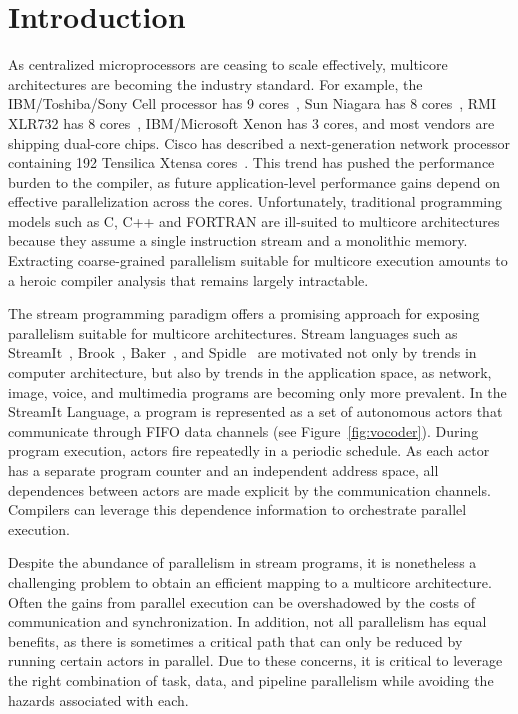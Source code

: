 \section{Introduction}


As centralized microprocessors are ceasing to scale effectively,
multicore architectures are becoming the industry standard.  For
example, the IBM/Toshiba/Sony Cell processor has 9 cores~\cite{Cell-hpca}, Sun
Niagara has 8 cores~\cite{Niagara}, RMI XLR732 has 8 cores~\cite{RMI-web},
IBM/Micro\-soft Xenon has 3 cores, and most vendors are shipping
dual-core chips.  Cisco has described a next-generation network
processor containing 192 Tensilica Xtensa cores~\cite{etherton05ancs}.
This trend has pushed the performance burden to the compiler, as
future application-level performance gains depend on effective
parallelization across the cores.  Unfortunately, traditional
programming models such as C, C++ and FORTRAN are ill-suited to
multicore architectures because they assume a single instruction
stream and a monolithic memory.  Extracting coarse-grained parallelism
suitable for multicore execution amounts to a heroic compiler analysis
that remains largely intractable.

The stream programming paradigm offers a promising approach for
exposing parallelism suitable for multicore architectures.  Stream
languages such as StreamIt~\cite{streamitcc}, Brook~\cite{brook04},
Baker~\cite{Baker}, and Spidle~\cite{spidle03} are motivated not only by
trends in computer architecture, but also by trends in the application
space, as network, image, voice, and multimedia programs are becoming
only more prevalent.  In the StreamIt Language, a program is represented
as a set of autonomous actors that communicate through FIFO data
channels (see Figure~\ref{fig:vocoder}).  During program execution,
actors fire repeatedly in a periodic schedule.  As each actor has a
separate program counter and an independent address space, all
dependences between actors are made explicit by the communication
channels.  Compilers can leverage this dependence information to
orchestrate parallel execution.

Despite the abundance of parallelism in stream programs, it is
nonetheless a challenging problem to obtain an efficient mapping to a
multicore architecture.  Often the gains from parallel execution can
be overshadowed by the costs of communication and synchronization.  In
addition, not all parallelism has equal benefits, as there is
sometimes a critical path that can only be reduced by running certain
actors in parallel.  Due to these concerns, it is critical to leverage
the right combination of task, data, and pipeline parallelism while
avoiding the hazards associated with each.

